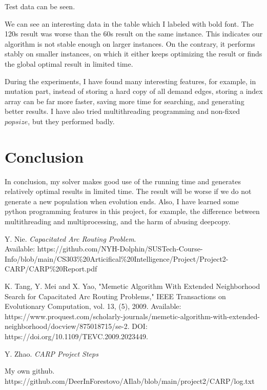 \documentclass[lettersize,journal]{IEEEtran}
\begin{document}
Test data can be seen\cite{ref4}.

We can see an interesting data in the table which I labeled with bold font. The 120s result was worse than the 60s result on the same instance. This indicates our algorithm is not stable enough on larger instances. On the contrary, it performs stably on smaller instances, on which it either keeps optimizing the result or finds the global optimal result in limited time.

During the experiments, I have found many interesting features, for example, in mutation part, instead of storing a hard copy of all demand edges, storing a index array can be far more faster, saving more time for searching, and generating better results. I have also tried multithreading programming and non-fixed $popsize$, but they performed badly.

\section{Conclusion}

In conclusion, my solver makes good use of the running time and generates relatively optimal results in limited time. The result will be worse if we do not generate a new population when evolution ends. Also, I have learned some python programming features in this project, for example, the difference between multithreading and multiprocessing, and the harm of abusing deepcopy.

\begin{thebibliography}{1}


Y. Nie. {\it{Capacitated Arc Routing Problem}}. \\Available: https://github.com/NYH-Dolphin/SUSTech-Course-Info/blob/main/CS303\%20Articifical\%20Intelligence/Project/Project2-CARP/CARP\%20Report.pdf

K. Tang, Y. Mei and X. Yao, "Memetic Algorithm With Extended Neighborhood Search for Capacitated Arc Routing Problems," IEEE Transactions on Evolutionary Computation, vol. 13, (5), 2009. Available: https://www.proquest.com/scholarly-journals/memetic-algorithm-with-extended-neighborhood/docview/875018715/se-2. DOI: https://doi.org/10.1109/TEVC.2009.2023449.

Y. Zhao. {\it{CARP Project Steps}}


My own github. https://github.com/DeerInForestovo/AIlab/blob/main/project2/CARP/log.txt

\end{thebibliography}
\end{document}
